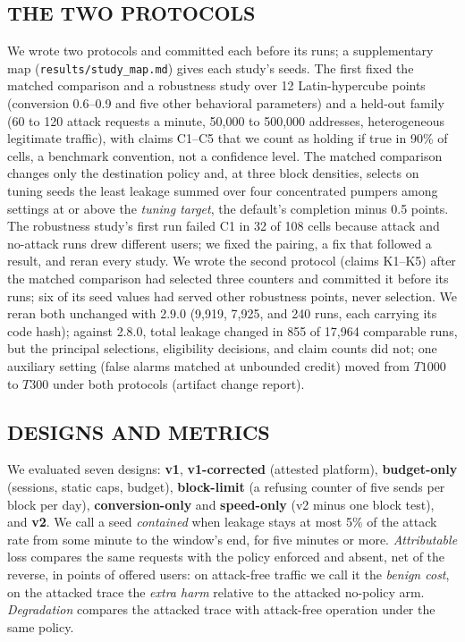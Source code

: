 \documentclass{IEEEoj}
\begin{document}
\subsection{THE TWO PROTOCOLS}
\label{sec:protocols}
We wrote two protocols and committed each before its runs; a supplementary map (\texttt{results/\allowbreak study\_map.md}) gives each study's seeds. The first fixed the matched comparison and a robustness study over 12 Latin-hypercube points (conversion 0.6--0.9 and five other behavioral parameters) and a held-out family (60 to 120 attack requests a minute, 50,000 to 500,000 addresses, heterogeneous legitimate traffic), with claims C1--C5 that we count as holding if true in 90\% of cells, a benchmark convention, not a confidence level. The matched comparison changes only the destination policy and, at three block densities, selects on tuning seeds the least leakage summed over four concentrated pumpers among settings at or above the \emph{tuning target}, the default's completion minus 0.5 points. The robustness study's first run failed C1 in 32 of 108 cells because attack and no-attack runs drew different users; we fixed the pairing, a fix that followed a result, and reran every study. We wrote the second protocol (claims K1--K5) after the matched comparison had selected three counters and committed it before its runs; six of its seed values had served other robustness points, never selection. We reran both unchanged with 2.9.0 (9,919, 7,925, and 240 runs, each carrying its code hash); against 2.8.0, total leakage changed in 855 of 17,964 comparable runs, but the principal selections, eligibility decisions, and claim counts did not; one auxiliary setting (false alarms matched at unbounded credit) moved from $T1000$ to $T300$ under both protocols (artifact change report).

\subsection{DESIGNS AND METRICS}
\label{sec:metrics}
We evaluated seven designs: \textbf{v1}, \textbf{v1-corrected} (attested platform), \textbf{budget-only} (sessions, static caps, budget), \textbf{block-limit} (a refusing counter of five sends per block per day), \textbf{conversion-only} and \textbf{speed-only} (v2 minus one block test), and \textbf{v2}. We call a seed \emph{contained} when leakage stays at most 5\% of the attack rate from some minute to the window's end, for five minutes or more. \emph{Attributable} loss compares the same requests with the policy enforced and absent, net of the reverse, in points of offered users: on attack-free traffic we call it the \emph{benign cost}, on the attacked trace the \emph{extra harm} relative to the attacked no-policy arm. \emph{Degradation} compares the attacked trace with attack-free operation under the same policy.
\end{document}
